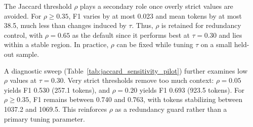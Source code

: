 \documentclass[runningheads]{llncs}
\begin{document}
The Jaccard threshold $\rho$ plays a secondary role once overly strict values are avoided. For $\rho\ge 0.35$, F1 varies by at most 0.023 and mean tokens by at most 38.5, much less than changes induced by $\tau$. Thus, $\rho$ is retained for redundancy control, with $\rho{=}0.65$ as the default since it performs best at $\tau{=}0.30$ and lies within a stable region. In practice, $\rho$ can be fixed while tuning $\tau$ on a small held-out sample.

A diagnostic sweep (Table~\ref{tab:jaccard_sensitivity_pilot}) further examines low $\rho$ values at $\tau{=}0.30$. Very strict thresholds remove too much context: $\rho{=}0.05$ yields F1 0.530 (257.1 tokens), and $\rho{=}0.20$ yields F1 0.693 (923.5 tokens). For $\rho\ge 0.35$, F1 remains between 0.740 and 0.763, with tokens stabilizing between 1037.2 and 1069.5. This reinforces $\rho$ as a redundancy guard rather than a primary tuning parameter.




\end{document}
